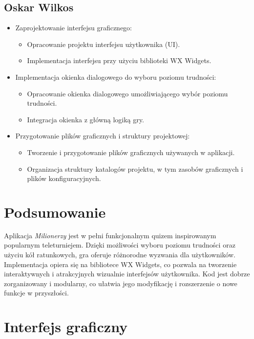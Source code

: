 \documentclass[]{article}
\begin{document}
\subsection{Oskar Wilkos}
\begin{itemize}
	\item Zaprojektowanie interfejsu graficznego:
	\begin{itemize}
		\item Opracowanie projektu interfejsu użytkownika (UI).
		\item Implementacja interfejsu przy użyciu biblioteki WX Widgets.
	\end{itemize}
	\item Implementacja okienka dialogowego do wyboru poziomu trudności:
	\begin{itemize}
		\item Opracowanie okienka dialogowego umożliwiającego wybór poziomu trudności.
		\item Integracja okienka z główną logiką gry.
	\end{itemize}
	\item Przygotowanie plików graficznych i struktury projektowej:
	\begin{itemize}
		\item Tworzenie i przygotowanie plików graficznych używanych w aplikacji.
		\item Organizacja struktury katalogów projektu, w tym zasobów graficznych i plików konfiguracyjnych.
	\end{itemize}
\end{itemize}

\section{Podsumowanie}
Aplikacja \emph{Milionerzy} jest w pełni funkcjonalnym quizem inspirowanym popularnym teleturniejem. Dzięki możliwości wyboru poziomu trudności oraz użyciu kół ratunkowych, gra oferuje różnorodne wyzwania dla użytkowników. Implementacja opiera się na bibliotece WX Widgets, co pozwala na tworzenie interaktywnych i atrakcyjnych wizualnie interfejsów użytkownika. Kod jest dobrze zorganizowany i modularny, co ułatwia jego modyfikację i rozszerzenie o nowe funkcje w przyszłości.

\section{Interfejs graficzny}
\end{document}
